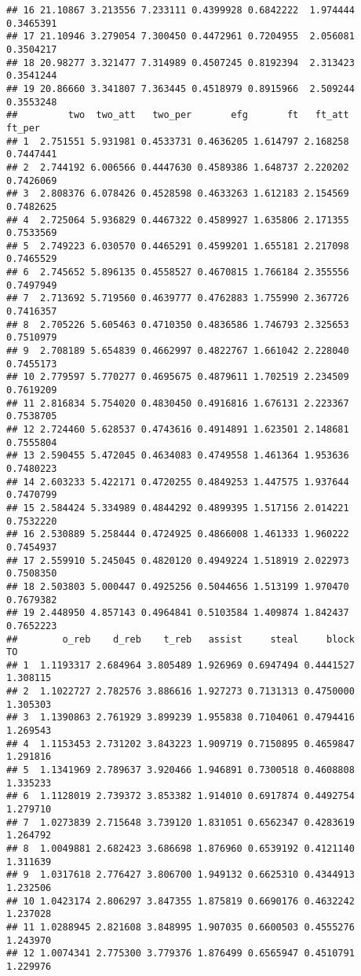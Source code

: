 \documentclass[]{article}
\begin{document}
\begin{verbatim}
## 16 21.10867 3.213556 7.233111 0.4399928 0.6842222  1.974444 0.3465391
## 17 21.10946 3.279054 7.300450 0.4472961 0.7204955  2.056081 0.3504217
## 18 20.98277 3.321477 7.314989 0.4507245 0.8192394  2.313423 0.3541244
## 19 20.86660 3.341807 7.363445 0.4518979 0.8915966  2.509244 0.3553248
##         two  two_att   two_per       efg       ft   ft_att    ft_per
## 1  2.751551 5.931981 0.4533731 0.4636205 1.614797 2.168258 0.7447441
## 2  2.744192 6.006566 0.4447630 0.4589386 1.648737 2.220202 0.7426069
## 3  2.808376 6.078426 0.4528598 0.4633263 1.612183 2.154569 0.7482625
## 4  2.725064 5.936829 0.4467322 0.4589927 1.635806 2.171355 0.7533569
## 5  2.749223 6.030570 0.4465291 0.4599201 1.655181 2.217098 0.7465529
## 6  2.745652 5.896135 0.4558527 0.4670815 1.766184 2.355556 0.7497949
## 7  2.713692 5.719560 0.4639777 0.4762883 1.755990 2.367726 0.7416357
## 8  2.705226 5.605463 0.4710350 0.4836586 1.746793 2.325653 0.7510979
## 9  2.708189 5.654839 0.4662997 0.4822767 1.661042 2.228040 0.7455173
## 10 2.779597 5.770277 0.4695675 0.4879611 1.702519 2.234509 0.7619209
## 11 2.816834 5.754020 0.4830450 0.4916816 1.676131 2.223367 0.7538705
## 12 2.724460 5.628537 0.4743616 0.4914891 1.623501 2.148681 0.7555804
## 13 2.590455 5.472045 0.4634083 0.4749558 1.461364 1.953636 0.7480223
## 14 2.603233 5.422171 0.4720255 0.4849253 1.447575 1.937644 0.7470799
## 15 2.584424 5.334989 0.4844292 0.4899395 1.517156 2.014221 0.7532220
## 16 2.530889 5.258444 0.4724925 0.4866008 1.461333 1.960222 0.7454937
## 17 2.559910 5.245045 0.4820120 0.4949224 1.518919 2.022973 0.7508350
## 18 2.503803 5.000447 0.4925256 0.5044656 1.513199 1.970470 0.7679382
## 19 2.448950 4.857143 0.4964841 0.5103584 1.409874 1.842437 0.7652223
##        o_reb    d_reb    t_reb   assist     steal     block       TO
## 1  1.1193317 2.684964 3.805489 1.926969 0.6947494 0.4441527 1.308115
## 2  1.1022727 2.782576 3.886616 1.927273 0.7131313 0.4750000 1.305303
## 3  1.1390863 2.761929 3.899239 1.955838 0.7104061 0.4794416 1.269543
## 4  1.1153453 2.731202 3.843223 1.909719 0.7150895 0.4659847 1.291816
## 5  1.1341969 2.789637 3.920466 1.946891 0.7300518 0.4608808 1.335233
## 6  1.1128019 2.739372 3.853382 1.914010 0.6917874 0.4492754 1.279710
## 7  1.0273839 2.715648 3.739120 1.831051 0.6562347 0.4283619 1.264792
## 8  1.0049881 2.682423 3.686698 1.876960 0.6539192 0.4121140 1.311639
## 9  1.0317618 2.776427 3.806700 1.949132 0.6625310 0.4344913 1.232506
## 10 1.0423174 2.806297 3.847355 1.875819 0.6690176 0.4632242 1.237028
## 11 1.0288945 2.821608 3.848995 1.907035 0.6600503 0.4555276 1.243970
## 12 1.0074341 2.775300 3.779376 1.876499 0.6565947 0.4510791 1.229976

\end{verbatim}
\end{document}
